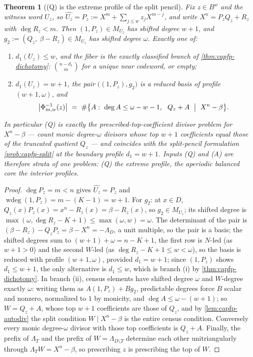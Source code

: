 \documentclass[11pt]{article}
\newtheorem{theorem}{Theorem}[section]
\theoremstyle{definition}
\theoremstyle{remark}
\newcommand{\B}{B}
\begin{document}
\begin{theorem}[\textup{(Q)} is the extreme profile of the split pencil]\label{thm:capfp-Q-unify}
Fix $z\in\B^w$ and the witness word $U_z$, so $\widehat{U_z}=P_z:=X^m+\sum_{j\le w}z_jX^{m-j}$, and write $X^n=P_zQ_z+R_z$ with $\deg R_z<m$.  Then $(1,P_z)\in M_{U_z}$ has shifted degree $w+1$, and $g_2:=(Q_z,\ \beta-R_z)\in M_{U_z}$ has shifted degree $\omega$.  Exactly one of:
\begin{enumerate}[label=\textup{(\roman*)}]
\item $d_1(U_z)\le w$, and the fiber is the exactly classified branch of \cref{thm:capfp-dichotomy}: $\binom{n-d_1}m$ for a unique near codeword, or empty;
\item $d_1(U_z)=w+1$, the pair $\bigl((1,P_z),g_2\bigr)$ is a reduced basis of profile $(w+1,\omega)$, and
\[
        \bigl|\Phi_{m,w}^{-1}(z)\bigr|\ =\ \#\bigl\{A:\ \deg A\le\omega-w-1,\ \ Q_z+A\ \bigm|\ X^n-\beta\bigr\}.
\]
\end{enumerate}
In particular \textup{(Q)} is exactly the prescribed-top-coefficient divisor problem for $X^n-\beta$ --- count monic degree-$\omega$ divisors whose top $w+1$ coefficients equal those of the truncated quotient $Q_z$ --- and coincides with the split-pencil formulation \cref{prob:capfp-split} at the boundary profile $d_1=w+1$.  Inputs \textup{(Q)} and \textup{(A)} are therefore strata of one problem: \textup{(Q)} the extreme profile, the aperiodic balanced core the interior profiles.
\end{theorem}

\begin{proof}
$\deg P_z=m<n$ gives $\widehat{U_z}=P_z$ and $\operatorname{wdeg}(1,P_z)=m-(K-1)=w+1$.  For $g_2$: at $x\in D$, $Q_z(x)P_z(x)=x^n-R_z(x)=\beta-R_z(x)$, so $g_2\in M_{U_z}$; its shifted degree is $\max(\omega,\deg R_z-K+1)\le\max(\omega,w)=\omega$.  The determinant of the pair is $(\beta-R_z)-Q_zP_z=\beta-X^n=-\Lambda_D$, a unit multiple, so the pair is a basis; the shifted degrees sum to $(w+1)+\omega=n-K+1$, the first row is $N$-led \textup(as $w+1>0$\textup) and the second $W$-led \textup(as $\deg R_z-K+1\le w<\omega$\textup), so the basis is reduced with profile $(w+1,\omega)$, provided $d_1=w+1$; since $(1,P_z)$ shows $d_1\le w+1$, the only alternative is $d_1\le w$, which is branch \textup{(i)} by \cref{thm:capfp-dichotomy}.  In branch \textup{(ii)}, census elements have shifted degree $\omega$ and $W$-degree exactly $\omega$: writing them as $A(1,P_z)+Bg_2$, predictable degrees force $B$ scalar and nonzero, normalized to $1$ by monicity, and $\deg A\le\omega-(w+1)$; so $W=Q_z+A$, whose top $w+1$ coefficients are those of $Q_z$, and by \cref{lem:capfp-autodiv} the split condition $W\mid X^n-\beta$ is the entire census condition.  Conversely every monic degree-$\omega$ divisor with those top coefficients is $Q_z+A$.  Finally, the prefix of $\Lambda_T$ and the prefix of $W=\Lambda_{D\setminus T}$ determine each other unitriangularly through $\Lambda_TW=X^n-\beta$, so prescribing $z$ is prescribing the top of $W$.
\end{proof}
\end{document}
